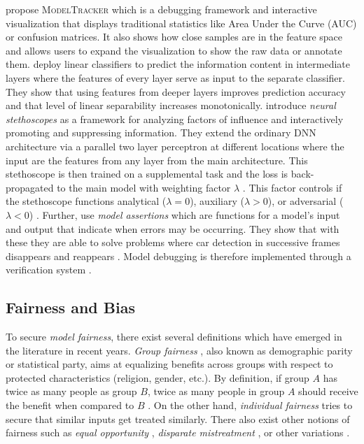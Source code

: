 \citet{amershi2015modeltracker} propose \textsc{ModelTracker} which is a debugging framework and interactive visualization that displays traditional statistics like Area Under the Curve (AUC) or confusion matrices. It also shows how close samples are in the feature space and allows users to expand the visualization to show the raw data or annotate them. \citet{AlainB17} deploy linear classifiers to predict the information content in intermediate layers where the features of every layer serve as input to the separate classifier. They show that using features from deeper layers improves prediction accuracy and  that level of linear separability increases monotonically. \citet{fuchs2018scrutinizing} introduce \emph{neural stethoscopes} as a framework for analyzing factors of influence and interactively promoting and suppressing information. They extend the ordinary DNN architecture via a parallel two layer perceptron at different locations where the input are the features from any layer from the main architecture. This stethoscope is then trained on a supplemental task and the loss is back-propagated to the main model with weighting factor $\lambda$ \citep{fuchs2018scrutinizing}. This factor controls if the stethoscope functions analytical ($\lambda = 0$), auxiliary ($\lambda > 0$), or adversarial ($\lambda < 0$) \citep{fuchs2018scrutinizing}. Further, \citet{KangRBZ20} use \emph{model assertions} which are functions for a model's input and output that indicate when errors may be occurring. They show that with these they are able to solve problems where car detection in successive frames disappears and reappears \citep{KangRBZ20}. Model debugging is therefore implemented through a verification system \citep{xie2020explainable}. 


\subsection{Fairness and Bias}
To secure \emph{model fairness}, there exist several definitions which have emerged in the literature in recent years. \emph{Group fairness} \citep{CaldersKP09}, also known as  demographic parity or statistical party, aims at equalizing benefits across groups with respect to protected characteristics (\eg religion, gender, etc.). By definition, if group $A$ has twice as many people as group $B$, twice as many people in group $A$ should receive the benefit when compared to $B$ \citep{xie2020explainable}. On the other hand, \emph{individual fairness} \citep{DworkHPRZ12} tries to secure that similar inputs get treated similarly. There also exist other notions of fairness such as \emph{equal opportunity} \citep{HardtPNS16}, \emph{disparate mistreatment} \citep{ZafarVGG17}, or other variations \citep{HeidariFGK18, WoodworthGOS17}.

